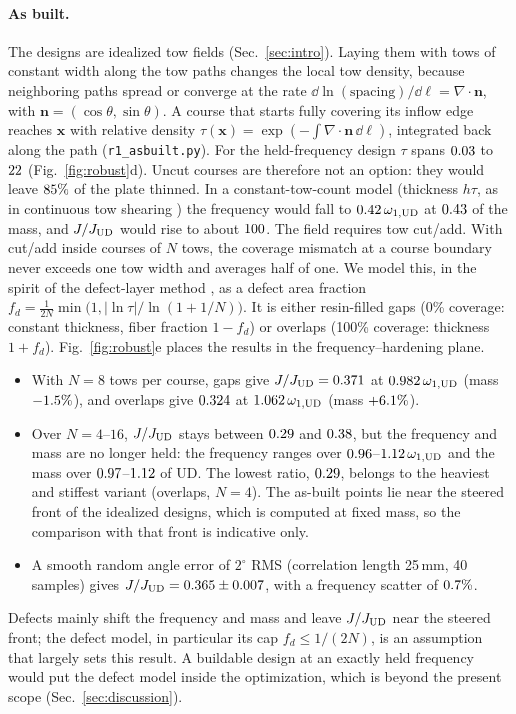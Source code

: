 \paragraph{As built.}\label{sec:asbuilt} The designs are idealized tow fields
(Sec.~\ref{sec:intro}). Laying them with tows of constant width along the tow paths changes the local
tow density, because neighboring paths spread or converge at the rate
$\dd\ln(\text{spacing})/\dd\ell=\nabla\!\cdot\bm n$, with $\bm n=(\cos\theta,\sin\theta)$. A course
that starts fully covering its inflow edge reaches $\bm x$ with relative density
$\tau(\bm x)=\exp(-\int\nabla\!\cdot\bm n\,\dd\ell)$, integrated back along the path
(\texttt{r1\_\allowbreak asbuilt.py}). For the held-frequency design $\tau$ spans $0.03$ to
$22$ (Fig.~\ref{fig:robust}d). Uncut courses are therefore not an option: they would leave
$85\%$ of the plate thinned. In a constant-tow-count model (thickness $h\tau$, as in continuous
tow shearing \cite{kim2012}) the frequency would fall to $0.42\,\omega_{1,\mathrm{UD}}$ at $0.43$ of the mass, and
$J/J_{\mathrm{UD}}$ would rise to about $100$. The field requires tow cut/add. With cut/add inside courses of $N$ tows, the coverage mismatch at a course
boundary never exceeds one tow width and averages half of one. We model this, in the spirit of the
defect-layer method \cite{fayazbakhsh2013}, as a defect area fraction
$f_d=\tfrac{1}{2N}\min\!\big(1,|\ln\tau|/\ln(1+1/N)\big)$. It is either resin-filled gaps (0\%
coverage: constant thickness, fiber fraction $1-f_d$) or overlaps (100\% coverage: thickness
$1+f_d$). Fig.~\ref{fig:robust}e places the results in the frequency--hardening plane.
\begin{itemize}[itemsep=1pt]
\item With $N=8$ tows per course, gaps give $J/J_{\mathrm{UD}}=0.371$ at $0.982\,\omega_{1,\mathrm{UD}}$
  (mass $-1.5\%$), and overlaps give $0.324$ at $1.062\,\omega_{1,\mathrm{UD}}$ (mass
  $+6.1\%$).
\item Over $N=4$--$16$, $J/J_{\mathrm{UD}}$ stays between $0.29$ and $0.38$, but the frequency and
  mass are no longer held: the frequency ranges over $0.96$--$1.12\,\omega_{1,\mathrm{UD}}$ and the mass
  over $0.97$--$1.12$ of UD. The lowest ratio, $0.29$, belongs to the heaviest and
  stiffest variant (overlaps, $N=4$). The as-built points lie near the steered front of the idealized
  designs, which is computed at fixed mass, so the comparison with that front is indicative only.
\item A smooth random angle error of $2^\circ$ RMS (correlation length 25\,mm, 40 samples) gives
  $J/J_{\mathrm{UD}}=0.365\pm0.007$, with a frequency scatter of $0.7\%$.
\end{itemize}
Defects mainly shift the frequency and mass and leave $J/J_{\mathrm{UD}}$ near the steered front; the
defect model, in particular its cap $f_d\le1/(2N)$, is an assumption that largely sets this result. A buildable design at an exactly held frequency would put the defect model
inside the optimization, which is beyond the present scope (Sec.~\ref{sec:discussion}).

